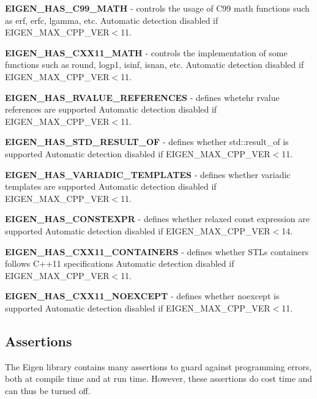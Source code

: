 \begin{DoxyItemize}
\item {\bfseries E\+I\+G\+E\+N\+\_\+\+H\+A\+S\+\_\+\+C99\+\_\+\+M\+A\+TH} -\/ controls the usage of C99 math functions such as erf, erfc, lgamma, etc. Automatic detection disabled if E\+I\+G\+E\+N\+\_\+\+M\+A\+X\+\_\+\+C\+P\+P\+\_\+\+V\+ER$<$11.
\item {\bfseries E\+I\+G\+E\+N\+\_\+\+H\+A\+S\+\_\+\+C\+X\+X11\+\_\+\+M\+A\+TH} -\/ controls the implementation of some functions such as round, logp1, isinf, isnan, etc. Automatic detection disabled if E\+I\+G\+E\+N\+\_\+\+M\+A\+X\+\_\+\+C\+P\+P\+\_\+\+V\+ER$<$11.
\item {\bfseries E\+I\+G\+E\+N\+\_\+\+H\+A\+S\+\_\+\+R\+V\+A\+L\+U\+E\+\_\+\+R\+E\+F\+E\+R\+E\+N\+C\+ES} -\/ defines whetehr rvalue references are supported Automatic detection disabled if E\+I\+G\+E\+N\+\_\+\+M\+A\+X\+\_\+\+C\+P\+P\+\_\+\+V\+ER$<$11.
\item {\bfseries E\+I\+G\+E\+N\+\_\+\+H\+A\+S\+\_\+\+S\+T\+D\+\_\+\+R\+E\+S\+U\+L\+T\+\_\+\+OF} -\/ defines whether std\+::result\+\_\+of is supported Automatic detection disabled if E\+I\+G\+E\+N\+\_\+\+M\+A\+X\+\_\+\+C\+P\+P\+\_\+\+V\+ER$<$11.
\item {\bfseries E\+I\+G\+E\+N\+\_\+\+H\+A\+S\+\_\+\+V\+A\+R\+I\+A\+D\+I\+C\+\_\+\+T\+E\+M\+P\+L\+A\+T\+ES} -\/ defines whether variadic templates are supported Automatic detection disabled if E\+I\+G\+E\+N\+\_\+\+M\+A\+X\+\_\+\+C\+P\+P\+\_\+\+V\+ER$<$11.
\item {\bfseries E\+I\+G\+E\+N\+\_\+\+H\+A\+S\+\_\+\+C\+O\+N\+S\+T\+E\+X\+PR} -\/ defines whether relaxed const expression are supported Automatic detection disabled if E\+I\+G\+E\+N\+\_\+\+M\+A\+X\+\_\+\+C\+P\+P\+\_\+\+V\+ER$<$14.
\item {\bfseries E\+I\+G\+E\+N\+\_\+\+H\+A\+S\+\_\+\+C\+X\+X11\+\_\+\+C\+O\+N\+T\+A\+I\+N\+E\+RS} -\/ defines whether S\+TL\textquotesingle{}s containers follows C++11 specifications Automatic detection disabled if E\+I\+G\+E\+N\+\_\+\+M\+A\+X\+\_\+\+C\+P\+P\+\_\+\+V\+ER$<$11.
\item {\bfseries E\+I\+G\+E\+N\+\_\+\+H\+A\+S\+\_\+\+C\+X\+X11\+\_\+\+N\+O\+E\+X\+C\+E\+PT} -\/ defines whether noexcept is supported Automatic detection disabled if E\+I\+G\+E\+N\+\_\+\+M\+A\+X\+\_\+\+C\+P\+P\+\_\+\+V\+ER$<$11.
\end{DoxyItemize}\hypertarget{_topic_preprocessor_directives_TopicPreprocessorDirectivesAssertions}{}\subsection{Assertions}\label{_topic_preprocessor_directives_TopicPreprocessorDirectivesAssertions}
The Eigen library contains many assertions to guard against programming errors, both at compile time and at run time. However, these assertions do cost time and can thus be turned off.


